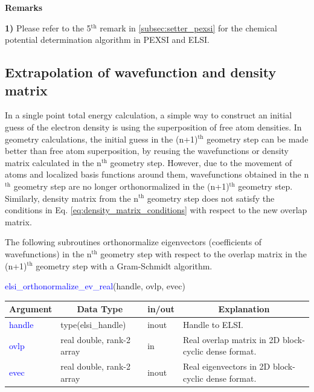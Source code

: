 \documentclass{report}
\begin{document}
\textbf{Remarks}

\textbf{1)} Please refer to the 5$^\text{th}$ remark in \ref{subsec:setter_pexsi} for the chemical potential determination algorithm in PEXSI and ELSI.

\subsection{Extrapolation of wavefunction and density matrix}
\label{subsec:extrapolation}
In a single point total energy calculation, a simple way to construct an initial guess of the electron density is using the superposition of free atom densities.  In geometry calculations, the initial guess in the (n+1)$^\text{th}$ geometry step can be made better than free atom superposition, by reusing the wavefunctions or density matrix calculated in the n$^\text{th}$ geometry step.  However, due to the movement of atoms and localized basis functions around them, wavefunctions obtained in the n$^\text{th}$ geometry step are no longer orthonormalized in the (n+1)$^\text{th}$ geometry step.  Similarly, density matrix from the n$^\text{th}$ geometry step does not satisfy the conditions in Eq. \ref{eq:density_matrix_conditions} with respect to the new overlap matrix.

The following subroutines orthonormalize eigenvectors (coefficients of wavefunctions) in the n$^\text{th}$ geometry step with respect to the overlap matrix in the (n+1)$^\text{th}$ geometry step with a Gram-Schmidt algorithm.
\begin{labeling}{\hspace{6cm}}
\item [\hspace{0.3cm} \textcolor{blue}{elsi\_orthonormalize\_ev\_real}(handle, ovlp, evec)]
\end{labeling}

\begin{tabular}[]{|p{20mm}|p{45mm}|p{15mm}|p{85mm}|}
\hline
\multicolumn{1}{|c|}{\textbf{Argument}} & \multicolumn{1}{c|}{\textbf{Data Type}} & \multicolumn{1}{c|}{\textbf{in/out}} & \multicolumn{1}{c|}{\textbf{Explanation}}\\
\hline
\textcolor{blue}{handle} & type(elsi\_handle)        & inout & Handle to ELSI.\\
\hline
\textcolor{blue}{ovlp}   & real double, rank-2 array & in    & Real overlap matrix in 2D block-cyclic dense format.\\
\hline
\textcolor{blue}{evec}   & real double, rank-2 array & inout & Real eigenvectors in 2D block-cyclic dense format.\\
\hline
\end{tabular}
\end{document}

